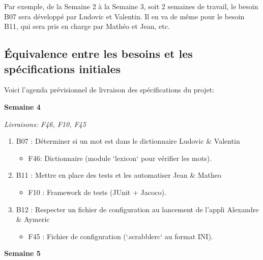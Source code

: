 \documentclass[a4paper,12pt]{article}
\begin{document}
Par exemple, de la Semaine 2 à la Semaine 3, soit 2 semaines de travail, le besoin B07 sera développé par Ludovic et Valentin. Il en va de même pour le besoin B11, qui sera pris en charge par Mathéo et Jean, etc.

\subsection{Équivalence entre les besoins et les spécifications initiales}

Voici l'agenda prévisionnel de livraison des spécifications du projet:\newline

\textbf{\large{Semaine 4}}

\textit{Livraisons: F46, F10, F45}\newline
\begin{enumerate}
    \item B07 : Déterminer si un mot est dans le dictionnaire\newline
    Ludovic \& Valentin
    \begin{itemize}
        \item F46: Dictionnaire (module `lexicon` pour vérifier les mots).
    \end{itemize}
    \item B11 : Mettre en place des tests et les automatiser\newline
    Jean \& Matheo
    \begin{itemize}
        \item F10 : Framework de tests (JUnit + Jacoco).
    \end{itemize}
    \item B12 : Respecter un fichier de configuration au lancement de l’appli\newline
    Alexandre \& Aymeric
    \begin{itemize}
        \item F45 : Fichier de configuration (`.scrabblerc` au format INI).\newline
    \end{itemize}
\end{enumerate}

\textbf{\large{Semaine 5}}
\end{document}
